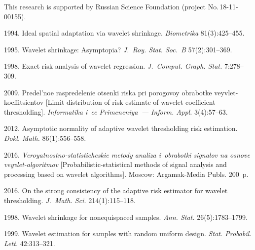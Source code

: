 \Ack
\noindent
This research is supported by Russian Science Foundation (project No.\,18-11-00155).



  \begin{multicols}{2}

\renewcommand{\bibname}{\protect\rmfamily References}

{\small\frenchspacing
 {%
 \begin{thebibliography}{99}

1994. Ideal spatial adaptation via wavelet shrinkage. \textit{Biometrika} 81(3):425--455.

1995. Wavelet shrinkage: Asymptopia? \textit{J.~Roy. Stat. Soc.~B}
57(2):301--369.

1998. Exact risk analysis of wavelet regression. \textit{J.~Comput. Graph. Stat.} 7:278--309.

 2009. Predel'noe raspredelenie otsenki riska pri 
porogovoy obrabotke veyvlet-koeffitsientov 
[Limit distribution of risk estimate of wavelet coefficient thresholding]. 
\textit{Informatika i~ee Primeneniya~--- Inform. Appl.}  3(4):57--63.

 2012. Asymptotic normality of adaptive wavelet thresholding 
risk estimation. \textit{Dokl. Math.} 86(1):556--558.

 2016. \textit{Veroyatnostno-statisticheskie metody analiza 
i~obrabotki signalov na osnove veyvlet-algoritmov} [Probabilistic-statistical 
methods of signal analysis and processing based on wavelet algorithms].
 Moscow: Argamak-Media Publs. 200~p.

  2016. On the strong consistency of the adaptive risk 
estimator for wavelet thresholding. \textit{J.~Math. Sci.} 214(1):115--118.

1998. Wavelet shrinkage for nonequispaced samples. 
\textit{Ann. Stat.} 26(5):1783--1799.

 1999. 
Wavelet estimation for samples with random uniform design.
\textit{Stat. Probabil. Lett.} 42:313--321.


\end{thebibliography}}}
\end{multicols}
